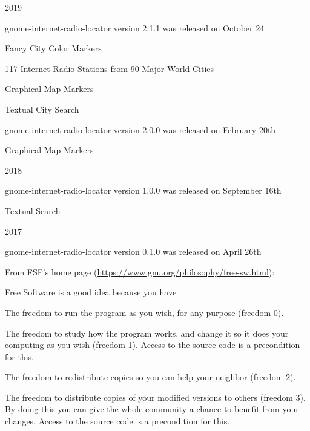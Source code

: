 \documentclass[20pt,landscape]{foils}
\begin{document}
\begin{list1}
\item 2019
  \begin{list2}
  \item gnome-internet-radio-locator version 2.1.1 was released on October 24
    \begin{list3}
    \item Fancy City Color Markers   
    \item 117 Internet Radio Stations from 90 Major World Cities
    \item Graphical Map Markers
    \item Textual City Search
    \end{list3}
  \end{list2}
  \begin{list3}
    \item gnome-internet-radio-locator version 2.0.0 was released on February 20th
      \begin{list3}
      \item Graphical Map Markers
      \end{list3}
  \end{list3}
\item 2018
  \begin{list2}
    \item gnome-internet-radio-locator version 1.0.0 was released on September 16th
    \begin{list3}
      \item Textual Search
    \end{list3}
  \end{list2}
\item 2017
  \begin{list2}
    \item gnome-internet-radio-locator version 0.1.0 was released on April 26th
  \end{list2}
\end{list1}


From FSF's home page (\url{https://www.gnu.org/philosophy/free-sw.html}):

\begin{list1}
\item Free Software is a good idea because you have
  \begin{list2}
    \item The freedom to run the program as you wish, for any purpose (freedom 0).
    \item The freedom to study how the program works, and change it so it does your computing as you wish (freedom 1). Access to the source code is a precondition for this.
    \item The freedom to redistribute copies so you can help your neighbor (freedom 2).
    \item The freedom to distribute copies of your modified versions to others (freedom 3). By doing this you can give the whole community a chance to benefit from your changes. Access to the source code is a precondition for this.
  \end{list2}
\end{list1}
\end{document}
